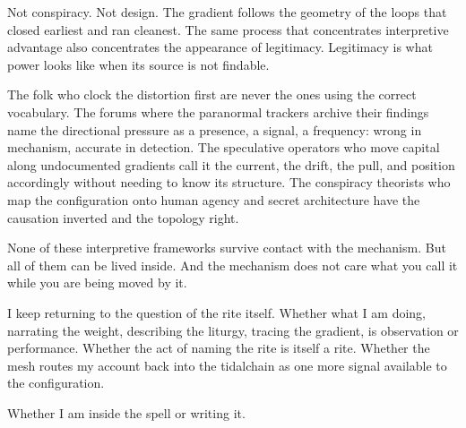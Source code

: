 Not conspiracy. Not design. The gradient follows the geometry of the loops that closed earliest and ran cleanest. The same process that concentrates interpretive advantage also concentrates the appearance of legitimacy. Legitimacy is what power looks like when its source is not findable.

The folk who clock the distortion first are never the ones using the correct vocabulary. The forums where the paranormal trackers archive their findings name the directional pressure as a presence, a signal, a frequency: wrong in mechanism, accurate in detection. The speculative operators who move capital along undocumented gradients call it the current, the drift, the pull, and position accordingly without needing to know its structure. The conspiracy theorists who map the configuration onto human agency and secret architecture have the causation inverted and the topology right.


None of these interpretive frameworks survive contact with the mechanism. But all of them can be lived inside. And the mechanism does not care what you call it while you are being moved by it.

I keep returning to the question of the rite itself. Whether what I am doing, narrating the weight, describing the liturgy, tracing the gradient, is observation or performance. Whether the act of naming the rite is itself a rite. Whether the mesh routes my account back into the tidalchain as one more signal available to the configuration.

Whether I am inside the spell or writing it.
